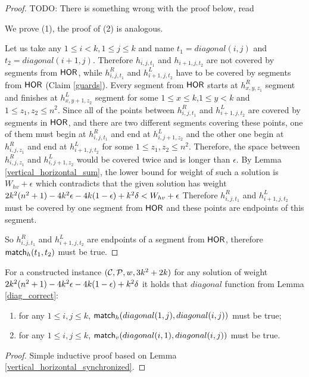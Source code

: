 \begin{proof}
TODO: There is something wrong with the proof below, read

We prove (1), the proof of (2) is analogous.

Let us take any $1 \le i < k, 1 \le j \le k$
and name $t_1 = diagonal(i, j)$ and $t_2 = diagonal(i+1, j)$.
Therefore $h_{i,j,t_1}$ and $h_{i+1,j,t_2}$
are not covered by segments from $\mathsf{HOR}$,
while $h^R_{i,j,t_1}$ and $h^L_{i+1,j,t_2}$
have to be covered by segments from $\mathsf{HOR}$ (Claim \ref{guards}).
Every segment from $\mathsf{HOR}$ starts at $h^R_{x,y,z_1}$
segment and finishes at $h^L_{x,y+1,z_2}$ segment for some
$1 \le x \le k$,$1 \le y < k$ and $1 \le z_1, z_2 \le n^2$.
Since all of the points between $h^R_{i,j,t_1}$ and $h^L_{i+1,j,t_2}$
are covered by segments in $\mathsf{HOR}$,
and there are two different segments covering
these points, one of them must begin
at $h^R_{i,j,t_1}$ and end at $h^L_{i,j+1,z_2}$
and the other one begin at $h^R_{i,j,z_1}$
and end at $h^L_{i+1,j,t_2}$
for some $1 \le z_1, z_2 \le n^2$.
Therefore, the space between $h^R_{i,j,z_1}$ and $h^L_{i,j+1,z_2}$
would be covered twice and is longer than $\epsilon$.
By Lemma \ref{vertical_horizontal_sum},
the lower bound for weight of such a solution is $W_{hv} + \epsilon$
which contradicts that the given solution has weight $2k^2(n^2+1) - 4k^2\epsilon -4k(1-\epsilon) +k^2\delta < W_{hv} + \epsilon$
Therefore $h^R_{i,j,t_1}$ and $h^L_{i+1,j,t_2}$ must be covered
by one segment from $\mathsf{HOR}$ and these points are endpoints of this segment.

So $h^R_{i,j,t_1}$ and $h^L_{i+1,j,t_2}$
are endpoints of a segment from $\mathsf{HOR}$,
therefore $\mathsf{match}_h(t_1,t_2)$ must be true.
\end{proof}

\begin{corollary}
\label{vertical_horizontal_synchronized_inductive}
For a constructed instance $(\mathcal{C}, \mathcal{P}, w, 3k^2+2k)$
for any solution of weight $2k^2(n^2+1) - 4k^2\epsilon -4k(1-\epsilon) +k^2\delta$ it holds that $diagonal$ function
from Lemma \ref{diag_correct}:
\begin{enumerate}
\item 
for any $1 \le i, j \le k$,
$\mathsf{match}_h(diagonal(1, j),diagonal(i, j))$ must be true;
\item 
for any $1 \le i, j \le k$,
$\mathsf{match}_v(diagonal(i, 1),diagonal(i, j))$ must be true.
\end{enumerate}
\end{corollary}
\begin{proof}
Simple inductive proof based on Lemma \ref{vertical_horizontal_synchronized}.
\end{proof}

